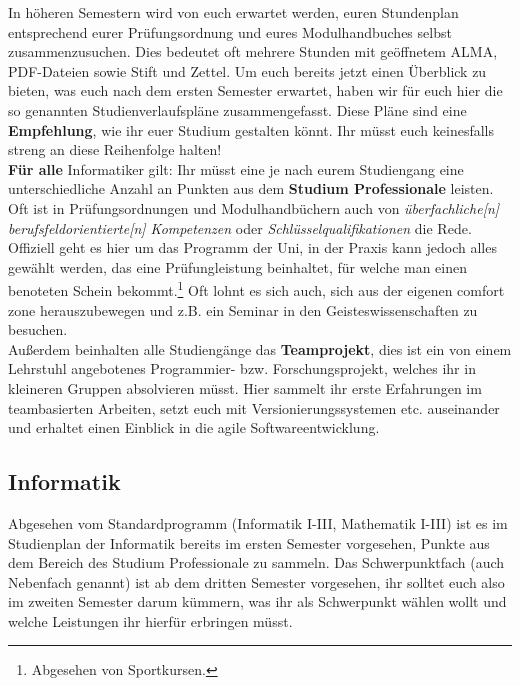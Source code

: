 In höheren Semestern wird von euch erwartet werden, euren Stundenplan entsprechend eurer Prüfungsordnung und eures Modulhandbuches selbst zusammenzusuchen.
Dies bedeutet oft mehrere Stunden mit geöffnetem ALMA, PDF-Dateien sowie Stift und Zettel. Um euch bereits jetzt einen Überblick zu bieten,
was euch nach dem ersten Semester erwartet, haben wir für euch hier die so genannten Studienverlaufspläne zusammengefasst. Diese Pläne sind eine \textbf{Empfehlung}, wie ihr euer Studium gestalten könnt. Ihr müsst euch keinesfalls streng an diese Reihenfolge halten! \medskip
\\
\textbf{Für alle} Informatiker gilt: Ihr müsst eine je nach eurem Studiengang eine unterschiedliche Anzahl an Punkten aus dem \textbf{Studium Professionale} leisten. Oft ist in Prüfungsordnungen und Modulhandbüchern auch von \emph{überfachliche[n] berufsfeldorientierte[n] Kompetenzen} oder \emph{Schlüsselqualifikationen} die Rede. Offiziell geht es hier um das Programm der Uni, in der Praxis kann jedoch alles gewählt werden, das eine Prüfungleistung beinhaltet, für welche man einen benoteten Schein bekommt.\footnote{Abgesehen von Sportkursen.} Oft lohnt es sich auch, sich aus der eigenen comfort zone herauszubewegen und z.B. ein Seminar in den Geisteswissenschaften zu besuchen. \\Außerdem beinhalten alle Studiengänge das \textbf{Teamprojekt}, dies ist ein von einem Lehrstuhl angebotenes Programmier- bzw. Forschungsprojekt, welches ihr in kleineren Gruppen absolvieren müsst. Hier sammelt ihr erste Erfahrungen im teambasierten Arbeiten, setzt euch mit Versionierungssystemen etc. auseinander und erhaltet einen Einblick in die agile Softwareentwicklung.
\vfill \pagebreak 
\subsection*{Informatik}
	
Abgesehen vom Standardprogramm (Informatik I-III, Mathematik I-III) ist es im Studienplan der Informatik bereits im ersten Semester vorgesehen, Punkte aus dem Bereich des Studium Professionale zu sammeln.  Das Schwerpunktfach (auch Nebenfach genannt) ist ab dem dritten Semester vorgesehen, ihr solltet euch also im zweiten Semester darum kümmern, was ihr als Schwerpunkt wählen wollt und welche Leistungen ihr hierfür erbringen müsst.
